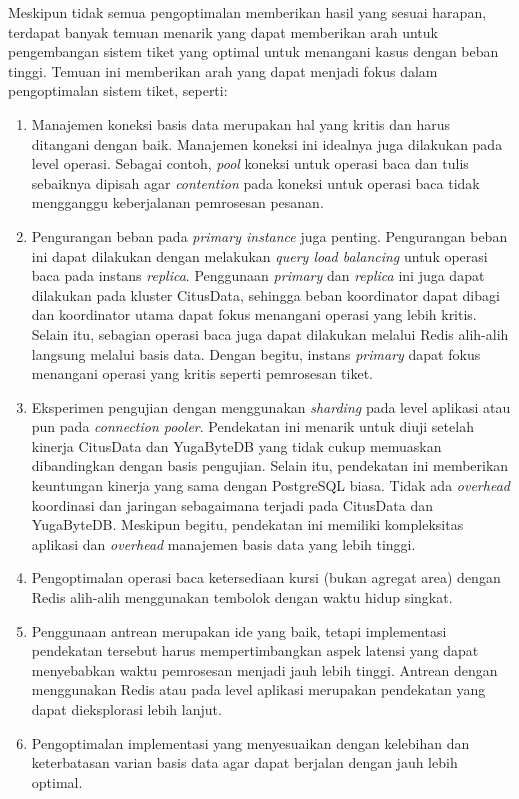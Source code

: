 Meskipun tidak semua pengoptimalan memberikan hasil yang sesuai harapan, terdapat banyak temuan menarik yang dapat memberikan arah untuk pengembangan sistem tiket yang optimal untuk menangani kasus dengan beban tinggi. Temuan ini memberikan arah yang dapat menjadi fokus dalam pengoptimalan sistem tiket, seperti:

\begin{enumerate}
    \item Manajemen koneksi basis data merupakan hal yang kritis dan harus ditangani dengan baik. Manajemen koneksi ini idealnya juga dilakukan pada level operasi. Sebagai contoh, \textit{pool} koneksi untuk operasi baca dan tulis sebaiknya dipisah agar \textit{contention} pada koneksi untuk operasi baca tidak mengganggu keberjalanan pemrosesan pesanan.
    \item Pengurangan beban pada \textit{primary instance} juga penting. Pengurangan beban ini dapat dilakukan dengan melakukan \textit{query load balancing} untuk operasi baca pada instans \textit{replica}. Penggunaan \textit{primary} dan \textit{replica} ini juga dapat dilakukan pada kluster CitusData, sehingga beban koordinator dapat dibagi dan koordinator utama dapat fokus menangani operasi yang lebih kritis. Selain itu, sebagian operasi baca juga dapat dilakukan melalui Redis alih-alih langsung melalui basis data. Dengan begitu, instans \textit{primary} dapat fokus menangani operasi yang kritis seperti pemrosesan tiket.
    \item Eksperimen pengujian dengan menggunakan \textit{sharding} pada level aplikasi atau pun pada \textit{connection pooler}. Pendekatan ini menarik untuk diuji setelah kinerja CitusData dan YugaByteDB yang tidak cukup memuaskan dibandingkan dengan basis pengujian. Selain itu, pendekatan ini memberikan keuntungan kinerja yang sama dengan PostgreSQL biasa. Tidak ada \textit{overhead} koordinasi dan jaringan sebagaimana terjadi pada CitusData dan YugaByteDB. Meskipun begitu, pendekatan ini memiliki kompleksitas aplikasi dan \textit{overhead} manajemen basis data yang lebih tinggi.
    \item Pengoptimalan operasi baca ketersediaan kursi (bukan agregat area) dengan Redis alih-alih menggunakan tembolok dengan waktu hidup singkat.
    \item Penggunaan antrean merupakan ide yang baik, tetapi implementasi pendekatan tersebut harus mempertimbangkan aspek latensi yang dapat menyebabkan waktu pemrosesan menjadi jauh lebih tinggi. Antrean dengan menggunakan Redis atau pada level aplikasi merupakan pendekatan yang dapat dieksplorasi lebih lanjut.
    \item Pengoptimalan implementasi yang menyesuaikan dengan kelebihan dan keterbatasan varian basis data agar dapat berjalan dengan jauh lebih optimal.
\end{enumerate}

